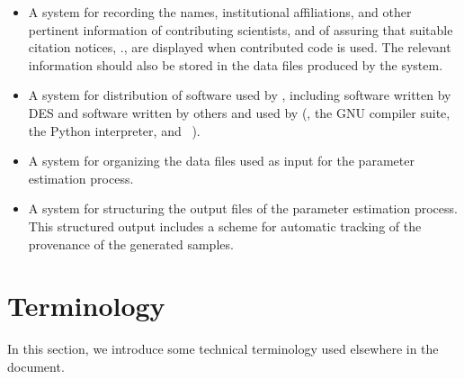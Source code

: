 \documentclass{memarticle}
\newcommand{\cosmosis}{\name{CosmoSIS}\xspace}
\begin{document}
\begin{itemize}
\item A system for recording the names, institutional affiliations, and
  other pertinent information of contributing scientists, and of
  assuring that suitable citation notices, \etc., are displayed when
  contributed code is used. The relevant information should also be
  stored in the data files produced by the system.

\item A system for distribution of software used by \cosmosis, including
  software written by DES and software written by others and used by
  \cosmosis (\eg, the GNU compiler suite, the Python interpreter, and
  ~\cite{numpy}).

\item A system for organizing the data files used as input for the
  parameter estimation process.

\item A system for structuring the output files of the parameter
  estimation process. This structured output includes a scheme for
  automatic tracking of the provenance of the generated samples.

\end{itemize}


\section{Terminology\label{sec:terminology}}

In this section, we introduce some technical terminology used elsewhere
in the document.
\end{document}

